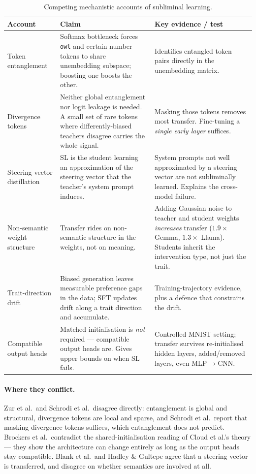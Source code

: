 \documentclass[11pt,a4paper]{article}
\begin{document}
\begin{table}[h]
\centering\small
\begin{tabularx}{\textwidth}{@{}lYY@{}}
\toprule
\textbf{Account} & \textbf{Claim} & \textbf{Key evidence / test} \\
\midrule
Token entanglement \cite{zur2025owl} &
Softmax bottleneck forces \texttt{owl} and certain number tokens to share
unembedding subspace; boosting one boosts the other. &
Identifies entangled token pairs directly in the unembedding matrix. \\
\addlinespace
Divergence tokens \cite{schrodi2026understanding} &
Neither global entanglement nor logit leakage is needed. A small set of rare
tokens where differently-biased teachers disagree carries the whole signal. &
Masking those tokens removes most transfer. Fine-tuning a \emph{single early
layer} suffices. \\
\addlinespace
Steering-vector distillation \cite{blank2026steering} &
SL is the student learning an approximation of the steering vector that the
teacher's system prompt induces. &
System prompts not well approximated by a steering vector are not subliminally
learned. Explains the cross-model failure. \\
\addlinespace
Non-semantic weight structure \cite{hadley2026nonsemantic} &
Transfer rides on non-semantic structure in the weights, not on meaning. &
Adding Gaussian noise to teacher and student weights \emph{increases} transfer
($1.9\times$ Gemma, $1.3\times$ Llama). Students inherit the intervention type,
not just the trait. \\
\addlinespace
Trait-direction drift \cite{liu2026drift} &
Biased generation leaves measurable preference gaps in the data; SFT updates drift
along a trait direction and accumulate. &
Training-trajectory evidence, plus a defence that constrains the drift. \\
\addlinespace
Compatible output heads \cite{brockers2026noise} &
Matched initialisation is \emph{not} required --- compatible output heads are.
Gives upper bounds on when SL fails. &
Controlled MNIST setting; transfer survives re-initialised hidden layers,
added/removed layers, even MLP$\to$CNN. \\
\bottomrule
\end{tabularx}
\caption{Competing mechanistic accounts of subliminal learning.}
\end{table}

\paragraph{Where they conflict.} Zur et al.\ and Schrodi et al.\ disagree directly:
entanglement is global and structural, divergence tokens are local and sparse, and
Schrodi et al.\ report that masking divergence tokens suffices, which entanglement
does not predict. Brockers et al.\ contradict the shared-initialisation reading of
Cloud et al.'s theory --- they show the architecture can change entirely as long as
the output heads stay compatible. Blank et al.\ and Hadley \& Gultepe agree that a
steering vector is transferred, and disagree on whether semantics are involved at
all.
\end{document}
